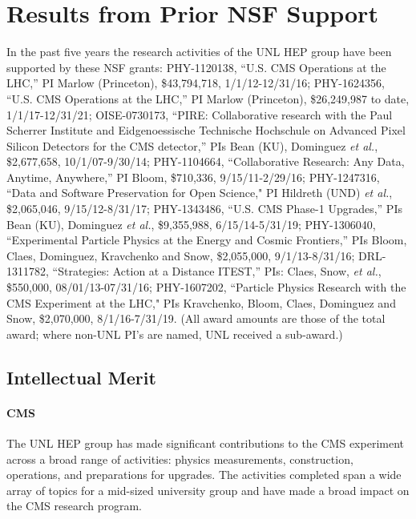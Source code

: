 \section{Results from Prior NSF Support}
\label{sec:prior}

In the past five years the research activities of the UNL HEP group have been supported by these NSF grants: 
PHY-1120138, ``U.S. CMS Operations at the LHC,'' PI Marlow (Princeton), \$43,794,718, 1/1/12-12/31/16; 
PHY-1624356, ``U.S. CMS Operations at the LHC,'' PI Marlow (Princeton), \$26,249,987 to date, 1/1/17-12/31/21; 
OISE-0730173, ``PIRE: Collaborative research with the Paul Scherrer Institute and Eidgenoessische Technische Hochschule on Advanced Pixel Silicon Detectors for the CMS detector,'' PIs Bean (KU), Dominguez {\it et al.}, \$2,677,658, 10/1/07-9/30/14; 
PHY-1104664, ``Collaborative Research: Any Data, Anytime, Anywhere,'' PI Bloom, \$710,336, 9/15/11-2/29/16;
PHY-1247316, ``Data and Software Preservation for Open Science," PI Hildreth (UND) {\it et al.}, \$2,065,046, 9/15/12-8/31/17;
PHY-1343486, ``U.S. CMS Phase-1 Upgrades,'' PIs Bean (KU), Dominguez {\it et al.}, \$9,355,988, 6/15/14-5/31/19;
PHY-1306040, ``Experimental Particle Physics at the Energy and Cosmic Frontiers,'' PIs Bloom, Claes, Dominguez, Kravchenko and Snow, \$2,055,000, 9/1/13-8/31/16;
DRL-1311782, ``Strategies: Action at a Distance ITEST,'' PIs: Claes, Snow, {\it et al.}, \$550,000, 08/01/13-07/31/16;
PHY-1607202, ``Particle Physics Research with the CMS Experiment at the LHC," PIs Kravchenko, Bloom, Claes, Dominguez and Snow, \$2,070,000, 8/1/16-7/31/19.
(All award amounts are those of the total award; where non-UNL PI's are named, UNL received a sub-award.)


\subsection{Intellectual Merit}

\paragraph{CMS}

The UNL HEP group has made significant contributions to the CMS experiment across a broad range of activities: physics measurements, construction, operations, and preparations for upgrades. The activities completed span a wide array of topics for a mid-sized university group and have made a broad impact on the CMS research program.

